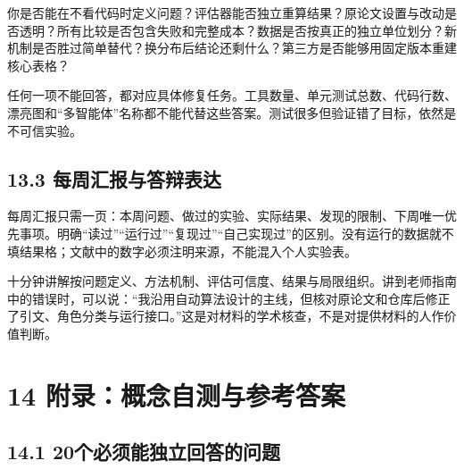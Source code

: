 你是否能在不看代码时定义问题？评估器能否独立重算结果？原论文设置与改动是否透明？所有比较是否包含失败和完整成本？数据是否按真正的独立单位划分？新机制是否胜过简单替代？换分布后结论还剩什么？第三方是否能够用固定版本重建核心表格？

任何一项不能回答，都对应具体修复任务。工具数量、单元测试总数、代码行数、漂亮图和``多智能体''名称都不能代替这些答案。测试很多但验证错了目标，依然是不可信实验。

\subsection{13.3
每周汇报与答辩表达}\label{ux6bcfux5468ux6c47ux62a5ux4e0eux7b54ux8fa9ux8868ux8fbe}

每周汇报只需一页：本周问题、做过的实验、实际结果、发现的限制、下周唯一优先事项。明确``读过''``运行过''``复现过''``自己实现过''的区别。没有运行的数据就不填结果格；文献中的数字必须注明来源，不能混入个人实验表。

十分钟讲解按问题定义、方法机制、评估可信度、结果与局限组织。讲到老师指南中的错误时，可以说：``我沿用自动算法设计的主线，但核对原论文和仓库后修正了引文、角色分类与运行接口。''这是对材料的学术核查，不是对提供材料的人作价值判断。

\section{14
附录：概念自测与参考答案}\label{ux9644ux5f55ux6982ux5ff5ux81eaux6d4bux4e0eux53c2ux8003ux7b54ux6848}

\subsection{14.1
20个必须能独立回答的问题}\label{ux4e2aux5fc5ux987bux80fdux72ecux7acbux56deux7b54ux7684ux95eeux9898}

